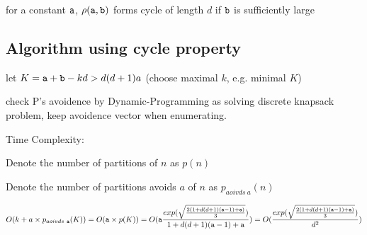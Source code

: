 \begin{corollary}
for a constant $\mathtt{a}$, $\rho(\mathtt{a},\mathtt{b})$ forms cycle of length $d$ if $\mathtt{b}$ is sufficiently large
\end{corollary}

\subsection{Algorithm using cycle property}

let $K=\mathtt{a}+\mathtt{b}-kd>d(d+1)a$ (choose maximal $k$, e.g. minimal $K$)

\begin{algorithmic}
     
    \ENDIF
  \ENDFOR
\end{algorithmic}
check P's avoidence by Dynamic-Programming as solving discrete knapsack problem, keep avoidence vector when enumerating.

Time Complexity:

Denote the number of partitions of $n$ as $p(n)$

Denote the number of partitions avoids $a$ of $n$ as $p_{aoivds\ a}(n)$

\[
O(k+a\times p_{aoivds\ \mathtt{a}}(K))\\
= O(\mathtt{a}\times p(K))\\
= O(\mathtt{a}\frac{exp(\sqrt{\frac{2(1+d(d+1)(\mathtt{a}-1)+\mathtt{a})}{3} } )}{1+d(d+1)(\mathtt{a}-1)+\mathtt{a}})
= O(\frac{exp(\sqrt{\frac{2(1+d(d+1)(\mathtt{a}-1)+\mathtt{a})}{3} } )}{d^2})
\]